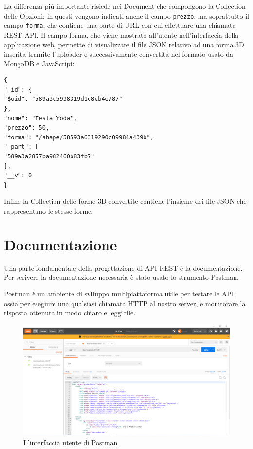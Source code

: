 La differenza più importante risiede nei Document che compongono la Collection delle Opzioni: in questi vengono indicati anche il campo \texttt{prezzo}, ma soprattutto il campo \texttt{forma}, che contiene una parte di URL con cui effettuare una chiamata REST API. Il campo forma, che viene mostrato all'utente nell'interfaccia della applicazione web, permette di visualizzare il file JSON relativo ad una forma 3D inserita tramite l'uploader e successivamente convertita nel formato usato da MongoDB e JavaScript:
\begin{lstlisting}[caption={Option Collection}, style=javaScriptCode]
{
"_id": {
"$oid": "589a3c5938319d1c8cb4e787"
},
"nome": "Testa Yoda",
"prezzo": 50,
"forma": "/shape/58593a6319290c09984a439b",
"_part": [
"589a3a2857ba982460b83fb7"
],
"__v": 0
}
\end{lstlisting}

Infine la Collection delle forme 3D convertite contiene l'insieme dei file JSON che rappresentano le stesse forme.

\section{Documentazione}
Una parte fondamentale della progettazione di API REST è la documentazione.
Per scrivere la documentazione necessaria è stato usato lo strumento Postman.

Postman è un ambiente di sviluppo multipiattaforma utile per testare le API, ossia per eseguire una qualsiasi chiamata HTTP al nostro server, e monitorare la risposta ottenuta in modo chiaro e leggibile. 
\begin{figure}[h]
	\centering
	\includegraphics[scale=0.35]{Immagini/postman_ui.png}
	\caption{L'interfaccia utente di Postman}
\end{figure}

